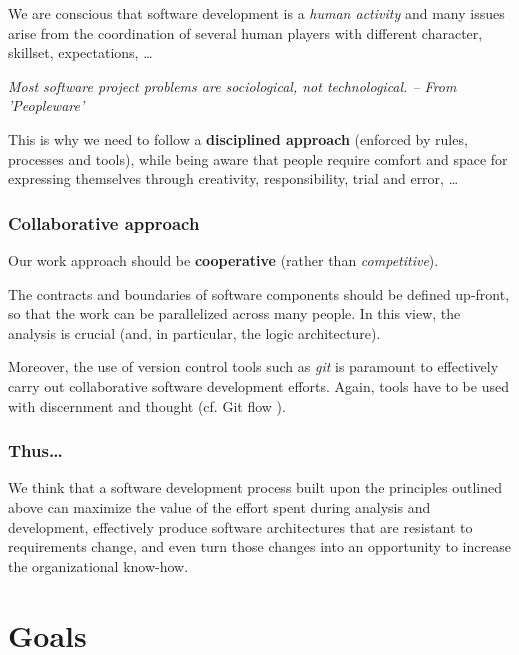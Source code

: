 \documentclass[11pt]{article}
\newcommand{\labelsec}[1]{\label{sec:#1}}
\newcommand{\myquote}[1]{
\setlength{\leftskip}{3cm}

\noindent \emph{#1}

\setlength{\leftskip}{0pt}
}
\begin{document}
We are conscious that software development is a \emph{human activity} and
many issues arise from the coordination of several human players with
different character, skillset, expectations, \ldots

\myquote{Most software project problems are sociological, not technological. --
From 'Peopleware' \cite{peopleware}}

This is why we need to follow a \textbf{disciplined approach} (enforced by
rules, processes and tools), while being aware that people require comfort and 
space for expressing themselves through creativity, responsibility, trial and error, \ldots

\subsubsection*{Collaborative approach}

Our work approach should be \textbf{cooperative} (rather than
\emph{competitive}).

The contracts and boundaries of software components should be defined up-front,
  so that the work can be parallelized across many people. In this view, the
  analysis is crucial (and, in particular, the logic architecture).
  
Moreover, the use of version control tools such as \emph{git} is paramount to 
  effectively carry out collaborative software development efforts. Again, 
  tools have to be used with discernment and thought (cf. Git flow
  \cite{gitflow}).



\subsubsection*{Thus\ldots}

We think that a software development process built upon the
principles outlined above can maximize the value of the effort spent
during analysis and development, effectively produce software architectures that
are resistant to requirements change, and even turn those changes into an
opportunity to increase the organizational know-how.




\section{Goals}
\labelsec{Goals}
\end{document}
